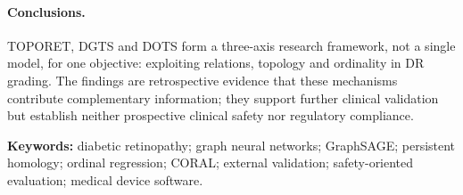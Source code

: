 \paragraph{Conclusions.}
TOPORET, DGTS and DOTS form a three-axis research framework, not a single model, for one
objective: exploiting relations, topology and ordinality in DR grading. The findings are
retrospective evidence that these mechanisms contribute complementary information; they
support further clinical validation but establish neither prospective clinical safety nor
regulatory compliance.

\vspace{0.6em}
\noindent\textbf{Keywords:} diabetic retinopathy; graph neural networks; GraphSAGE;
persistent homology; ordinal regression; CORAL; external validation; safety-oriented evaluation;
medical device software.
\par\endgroup
